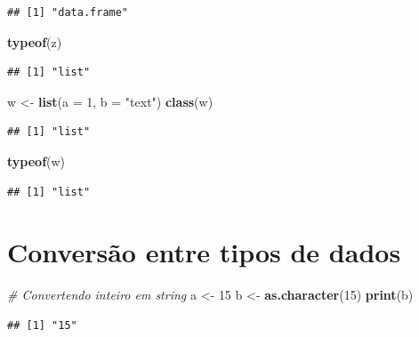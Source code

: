 \documentclass[
]{book}
\newenvironment{Shaded}{\begin{snugshade}}{\end{snugshade}}
\newcommand{\AttributeTok}[1]{\textcolor[rgb]{0.13,0.29,0.53}{#1}}
\newcommand{\CommentTok}[1]{\textcolor[rgb]{0.56,0.35,0.01}{\textit{#1}}}
\newcommand{\DecValTok}[1]{\textcolor[rgb]{0.00,0.00,0.81}{#1}}
\newcommand{\FunctionTok}[1]{\textcolor[rgb]{0.13,0.29,0.53}{\textbf{#1}}}
\newcommand{\NormalTok}[1]{#1}
\newcommand{\OtherTok}[1]{\textcolor[rgb]{0.56,0.35,0.01}{#1}}
\newcommand{\StringTok}[1]{\textcolor[rgb]{0.31,0.60,0.02}{#1}}
\begin{document}
\begin{verbatim}
## [1] "data.frame"
\end{verbatim}

\begin{Shaded}
\begin{Highlighting}[]
\FunctionTok{typeof}\NormalTok{(z) }
\end{Highlighting}
\end{Shaded}

\begin{verbatim}
## [1] "list"
\end{verbatim}

\begin{Shaded}
\begin{Highlighting}[]
\NormalTok{w }\OtherTok{\textless{}{-}} \FunctionTok{list}\NormalTok{(}\AttributeTok{a =} \DecValTok{1}\NormalTok{, }\AttributeTok{b =} \StringTok{"text"}\NormalTok{)}
\FunctionTok{class}\NormalTok{(w) }
\end{Highlighting}
\end{Shaded}

\begin{verbatim}
## [1] "list"
\end{verbatim}

\begin{Shaded}
\begin{Highlighting}[]
\FunctionTok{typeof}\NormalTok{(w) }
\end{Highlighting}
\end{Shaded}

\begin{verbatim}
## [1] "list"
\end{verbatim}

\section{Conversão entre tipos de dados}\label{conversuxe3o-entre-tipos-de-dados}

\begin{Shaded}
\begin{Highlighting}[]
\CommentTok{\# Convertendo inteiro em string }
\NormalTok{a }\OtherTok{\textless{}{-}} \DecValTok{15}
\NormalTok{b }\OtherTok{\textless{}{-}} \FunctionTok{as.character}\NormalTok{(}\DecValTok{15}\NormalTok{)}
\FunctionTok{print}\NormalTok{(b)}
\end{Highlighting}
\end{Shaded}

\begin{verbatim}
## [1] "15"
\end{verbatim}
\end{document}
